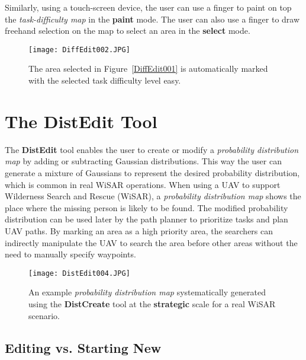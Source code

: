 Similarly, using a touch-screen device, the user can use a finger to paint on top the \textit{task-difficulty map} in the \textbf{paint} mode. The user can also use a finger to draw freehand selection on the map to select an area in the \textbf{select} mode.


\begin{figure}
\centering
\texttt{[image: DiffEdit002.JPG]}
\caption[Lasso selection tool used to paint an area with task difficulty easy]{The area selected in Figure~\ref{DiffEdit001} is automatically marked with the selected task difficulty level easy.}
\label{DiffEdit002}
\end{figure}

\section{The DistEdit Tool}
\label{DistEdit}

The \textbf{DistEdit} tool enables the user to create or modify a \textit{probability distribution map} by adding or subtracting Gaussian distributions. This way the user can generate a mixture of Gaussians to represent the desired probability distribution, which is common in real WiSAR operations.  When using a UAV to support Wilderness Search and Rescue (WiSAR), a \textit{probability distribution map} shows the place where the missing person is likely to be found. The modified probability distribution can be used later by the path planner to prioritize tasks and plan UAV paths. By marking an area as a high priority area, the searchers can indirectly manipulate the UAV to search the area before other areas without the need to manually specify waypoints.

\begin{figure}
\centering
\texttt{[image: DistEdit004.JPG]}
\caption[Probability distribution map created with DistCreate (real WiSAR scenario)]{An example \textit{probability distribution map} systematically generated using the \textbf{DistCreate} tool at the \textbf{strategic} scale for a real WiSAR scenario.}
\label{DistEdit004}
\end{figure}

\subsection{Editing vs. Starting New}

